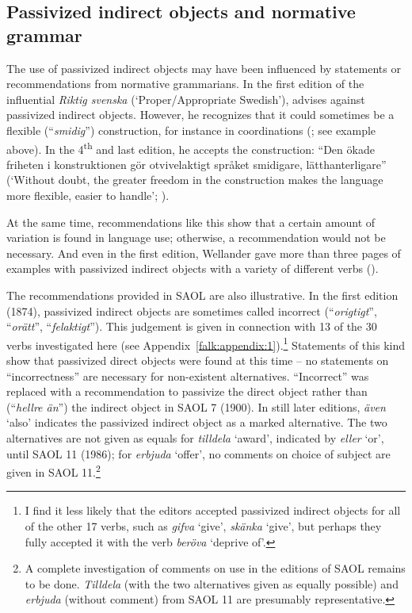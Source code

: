 \documentclass[output=paper]{langscibook}
\begin{document}
\subsection{Passivized indirect objects and normative grammar}\label{sec:falk:3.6}


The use of passivized indirect objects may have been influenced by statements or recommendations from normative grammarians. In the first edition of the influential \textit{Riktig svenska} (‘Proper/Appropriate Swedish’), \citet{Wellander1939} advises against passivized indirect objects. However, he recognizes that it could sometimes be a flexible (“\textit{smidig}”) construction, for instance in coordinations (\citeyear[291]{Wellander1939}; see example  above). In the 4\textsuperscript{th} and last edition, he accepts the construction: “Den ökade friheten i konstruktionen gör otvivelaktigt språket smidigare, lätthanterligare” (‘Without doubt, the greater freedom in the construction makes the language more flexible, easier to handle’; \citeyear[148–149]{Wellander1973}).


At the same time, recommendations like this show that a certain amount of variation is found in language use; otherwise, a recommendation would not be necessary. And even in the first edition, Wellander gave more than three pages of examples with passivized indirect objects with a variety of different verbs (\citeyear[297–301]{Wellander1939}).  



The recommendations provided in SAOL are also illustrative. In the first edition (1874), passivized indirect objects are sometimes called incorrect (“\textit{origtigt}”, “\textit{orätt}”, “\textit{felaktigt}”). This judgement is given in connection with 13 of the 30 verbs investigated here (see Appendix~\ref{falk:appendix:1}).\footnote{I find it less likely that the editors accepted passivized indirect objects for all of the other 17 verbs, such as \textit{gifva} ‘give’, \textit{skänka} ‘give’, but perhaps they fully accepted it with the verb \textit{beröva} ‘deprive of’.} Statements of this kind show that passivized direct objects were found at this time – no statements on “incorrectness” are necessary for non-existent alternatives. “Incorrect” was replaced with a recommendation to passivize the direct object rather than (“\textit{hellre än}”) the indirect object in SAOL 7 (1900). In still later editions, \textit{även} ‘also’ indicates the passivized indirect object as a marked alternative. The two alternatives are not given as equals for \textit{tilldela} ‘award’, indicated by \textit{eller} ‘or’, until SAOL 11 (1986); for \textit{erbjuda} ‘offer’, no comments on choice of subject are given in SAOL 11.\footnote{A complete investigation of comments on use in the editions of SAOL remains to be done. \textit{Tilldela} (with the two alternatives given as equally possible) and \textit{erbjuda} (without comment) from SAOL 11 are presumably representative.}
\end{document}
